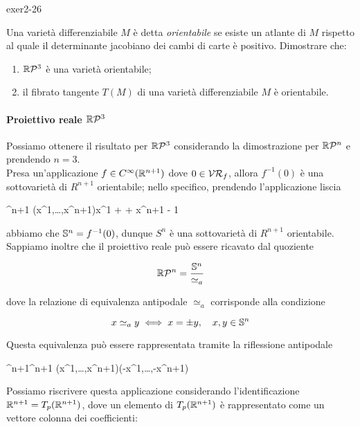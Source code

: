 
{exer2-26}
{
Una varietà differenziabile $ M $ è detta \textit{orientabile} se esiste un atlante di $ M $ rispetto al quale il determinante jacobiano dei cambi di carte è positivo. Dimostrare che:

\begin{enumerate}
	\item $ \rp{3} $ è una varietà orientabile;
	\item il fibrato tangente $ T(M) $ di una varietà differenziabile $ M $ è orientabile.
\end{enumerate}
}
{
\paragraph{Proiettivo reale $ \rp{3} $}

Possiamo ottenere il risultato per $ \rp{3} $ considerando la dimostrazione per $ \rp{n} $ e prendendo $ n = 3 $. \\
Presa un'applicazione $ f \in C^{\infty}(\R^{n+1}) $ dove $ 0 \in \VR_{f} $, allora $ f^{-1}(0) $ è una sottovarietà di $ R^{n+1} $ orientabile; nello specifico, prendendo  l'applicazione liscia

	{\R^{n+1}}{\R}
	{(x^{1},\dots,x^{n+1})}{x^{1} + \cdots + x^{n+1} - 1}

abbiamo che $ \S^{n} = f^{-1}(0) $, dunque $ S^{n} $ è una sottovarietà di $ R^{n+1} $ orientabile. \\
Sappiamo inoltre che il proiettivo reale può essere ricavato dal quoziente

\begin{equation}
	\rp{n} = \dfrac{\S^{n}}{\simeq_{a}}
\end{equation}

dove la relazione di equivalenza antipodale $ \simeq_{a} $ corrisponde alla condizione

\begin{equation}
	x \simeq_{a} y \iff x = \pm y \qcomma x,y \in \S^{n}
\end{equation}

Questa equivalenza può essere rappresentata tramite la riflessione antipodale

	{\R^{n+1}}{\R^{n+1}}
	{(x^{1},\dots,x^{n+1})}{(-x^{1},\dots,-x^{n+1})}

Possiamo riscrivere questa applicazione considerando l'identificazione $ \R^{n+1} = T_{p}(\R^{n+1}) $, dove un elemento di $ T_{p}(\R^{n+1}) $ è rappresentato come un vettore colonna dei coefficienti:

}
